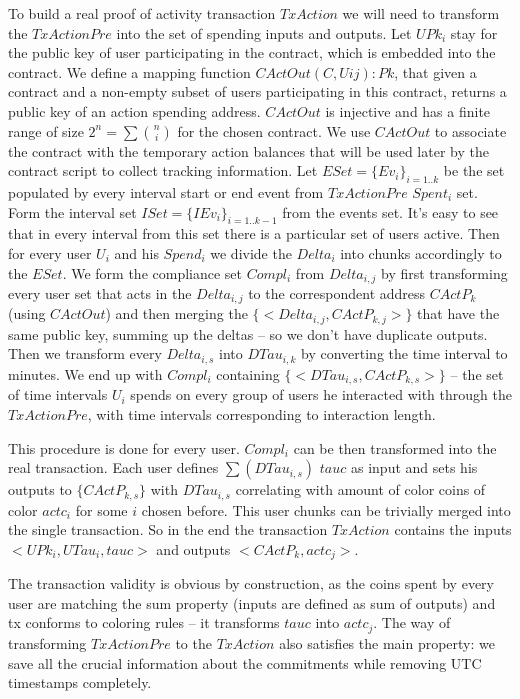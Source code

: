 \documentclass[]{itmo-student-thesis}
\begin{document}
To build a real proof of activity transaction $TxAction$ we will need
to transform the $TxActionPre$ into the set of spending inputs and
outputs. Let $UPk_i$ stay for the public key of user participating in
the contract, which is embedded into the contract. We define a mapping
function $CActOut(C, {Uij}) : Pk$, that given a contract and a
non-empty subset of users participating in this contract, returns a
public key of an action spending address. $CActOut$ is injective and
has a finite range of size $2^n = \sum{\binom{n}{i}}$ for the chosen
contract. We use $CActOut$ to associate the contract with the
temporary action balances that will be used later by the contract
script to collect tracking information. Let $ESet = \{Ev_i\}_{i=1..k}$
be the set populated by every interval start or end event from
$TxActionPre$ $Spent_i$ set. Form the interval set $ISet =
\{IEv_i\}_{i=1..k-1}$ from the events set. It’s easy to see that in
every interval from this set there is a particular set of users
active. Then for every user $U_i$ and his $Spend_i$ we divide the
$Delta_i$ into chunks accordingly to the $ESet$. We form the
compliance set $Compl_i$ from $Delta_{i,j}$ by first transforming
every user set that acts in the $Delta_{i,j}$ to the correspondent
address $CActP_k$ (using $CActOut$) and then merging the
$\{<Delta_{i,j}, CActP_{k,j}>\}$ that have the same public key,
summing up the deltas -- so we don’t have duplicate outputs. Then we
transform every $Delta_{i,s}$ into $DTau_{i,k}$ by converting the
time interval to minutes. We end up with $Compl_i$ containing
$\{<DTau_{i,s}, CActP_{k,s}>\}$ -- the set of time intervals $U_i$
spends on every group of users he interacted with through the
$TxActionPre$, with time intervals corresponding to interaction
length.

This procedure is done for every user. ${Compl_i}$ can be then
transformed into the real transaction. Each user defines
$\sum(DTau_{i,s})$ $tauc$ as input and sets his outputs to
$\{CActP_{k,s}\}$ with $DTau_{i,s}$ correlating with amount of color
coins of color $actc_i$ for some $i$ chosen before. This user chunks
can be trivially merged into the single transaction. So in the end the
transaction $TxAction$ contains the inputs $<UPk_i, UTau_i, tauc>$ and
outputs $<CActP_k, actc_j>$.

The transaction validity is obvious by construction, as the coins
spent by every user are matching the sum property (inputs are defined
as sum of outputs) and tx conforms to coloring rules -- it transforms
$tauc$ into $actc_j$. The way of transforming $TxActionPre$ to the
$TxAction$ also satisfies the main property: we save all the crucial
information about the commitments while removing UTC timestamps
completely.
\end{document}
